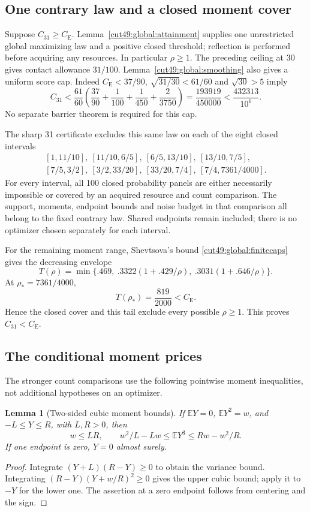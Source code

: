 \documentclass[11pt,a4paper]{article}
\numberwithin{equation}{section}
\newtheorem{lemma}[theorem]{Lemma}
\theoremstyle{definition}
\theoremstyle{remark}
\newcommand{\E}{\mathbb E}
\newcommand{\CE}{C_{\mathrm E}}
\begin{document}
\subsection{One contrary law and a closed moment cover}
Suppose \(C_{31}\ge\CE\). Lemma~\ref{cut49:global:attainment}
supplies one unrestricted global maximizing law and a positive
closed threshold; reflection is performed before acquiring any
resources. In particular \(\rho\ge1\). The preceding ceiling
at 30 gives contact allowance \(31/100\).
Lemma~\ref{cut49:global:smoothing} also gives a uniform score cap.
Indeed \(\CE<37/90\), \(\sqrt{31/30}<61/60\) and
\(\sqrt{30}>5\) imply
\[
 C_{31}<\frac{61}{60}
 \left(\frac{37}{90}+\frac1{100}+\frac1{450}+\frac2{3750}\right)
 =\frac{193919}{450000}<\frac{432313}{10^6}.
\]
No separate barrier theorem is required for this cap.

The sharp 31 certificate excludes this same law on each of the
eight closed intervals
\begin{equation}\label{cut31:moment-cover}
\begin{gathered}
 [1,11/10],\ [11/10,6/5],\ [6/5,13/10],\ [13/10,7/5],\\
 [7/5,3/2],\ [3/2,33/20],\ [33/20,7/4],\ [7/4,7361/4000].
\end{gathered}
\end{equation}
For every interval, all 100 closed probability panels are either
necessarily impossible or covered by an acquired resource and
count comparison. The support, moments, endpoint bounds and noise
budget in that comparison all belong to the fixed contrary law.
Shared endpoints remain included; there is no optimizer chosen
separately for each interval.

For the remaining moment range, Shevtsova's bound
\eqref{cut49:global:finitecaps} gives the decreasing envelope
\[
 T(\rho)=\min\{.469,\ .3322(1+.429/\rho),\ .3031(1+.646/\rho)\}.
\]
At \(\rho_*=7361/4000\),
\[
 T(\rho_*)=\frac{819}{2000}<\CE.
\]
Hence the closed cover and this tail exclude every possible
\(\rho\ge1\). This proves \(C_{31}<\CE\).

\subsection{The conditional moment prices}
The stronger count comparisons use the following pointwise moment
inequalities, not additional hypotheses on an optimizer.
\begin{lemma}[Two-sided cubic moment bounds]\label{cut31:cubic:bounds}
If \(\E Y=0\), \(\E Y^2=w\), and \(-L\le Y\le R\), with
\(L,R>0\), then
\[
 w\le LR,\qquad w^2/L-Lw\le\E Y^3\le Rw-w^2/R.
\]
If one endpoint is zero, \(Y=0\) almost surely.
\end{lemma}
\begin{proof}
Integrate \((Y+L)(R-Y)\ge0\) to obtain the variance bound.
Integrating \((R-Y)(Y+w/R)^2\ge0\) gives the upper cubic
bound; apply it to \(-Y\) for the lower one.
The assertion at a zero endpoint follows from centering and the sign.
\end{proof}
\end{document}
